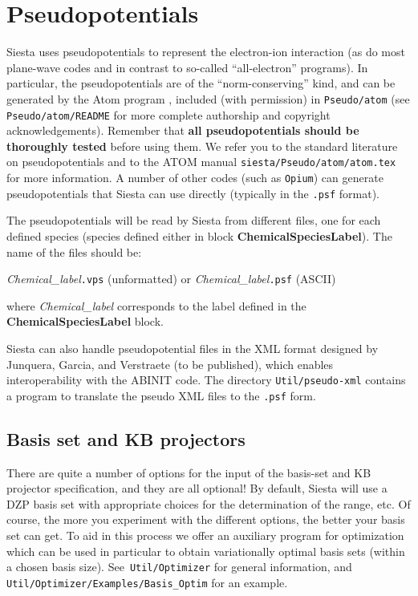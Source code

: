 \documentclass[11pt]{article}
\begin{document}
\vspace{5pt}
\section{Pseudopotentials}

{\sc Siesta} uses pseudopotentials to represent the electron-ion
interaction (as do most plane-wave codes and in contrast to so-called
``all-electron'' programs). In particular, the pseudopotentials are of
the ``norm-conserving'' kind, and can be generated by the {\sc Atom} program
, included (with permission) in {\tt Pseudo/atom} (see {\tt
  Pseudo/atom/README} for more complete authorship and
copyright acknowledgements). Remember that {\bf all pseudopotentials
  should be thoroughly tested} before using them. We refer you to the
standard literature on pseudopotentials and to the {\sc ATOM} manual
{\tt siesta/Pseudo/atom/atom.tex} for more information. A number of
other codes (such as {\tt Opium}) can generate pseudopotentials that
{\sc Siesta} can use directly (typically in the {\tt .psf} format).

The pseudopotentials will be read by {\sc Siesta} from different files, one
for each defined species (species defined either in block
{\bf ChemicalSpeciesLabel}).
The name of the files should be:

{\it Chemical\_label}{\tt .vps} (unformatted) or
{\it Chemical\_label}{\tt .psf} (ASCII)

\noindent 
where {\it Chemical\_label} corresponds to the label defined in the
{\bf ChemicalSpeciesLabel} block.
        
Siesta can also handle pseudopotential files in the XML format
designed by Junquera, Garcia, and Verstraete (to be published), which
enables interoperability with the ABINIT code. The directory
{\tt Util/pseudo-xml} contains a program to translate the pseudo
XML files to the {\tt .psf} form.


\vspace{5pt}
\subsection{Basis set and KB projectors} 

\noindent 

There are quite a number of options for the input of the basis-set and
KB projector specification, and they are all optional! By default,
{\sc Siesta} will use a DZP basis set with appropriate choices for the
determination of the range, etc. Of course, the more you experiment
with the different options, the better your basis set can get. To aid
in this process we offer an auxiliary program for optimization which
can be used in particular to obtain variationally optimal basis sets
(within a chosen basis size). See {\tt Util/Optimizer}
for general information, and {\tt Util/Optimizer/Examples/Basis\_Optim}
for an example.
\end{document}
